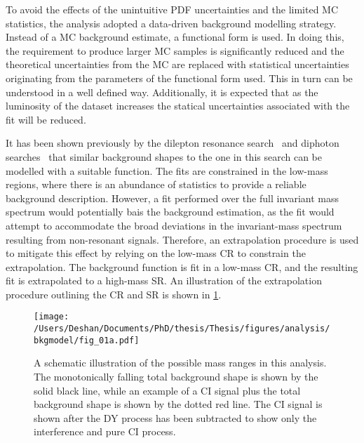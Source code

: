 To avoid the effects of the unintuitive PDF uncertainties and the limited MC statistics, the analysis adopted a data-driven background modelling strategy. Instead of a MC background estimate, a functional form is used. In doing this, the requirement to produce larger MC samples is significantly reduced and the theoretical uncertainties from the MC are replaced with statistical uncertainties originating from the parameters of the functional form used. This in turn can be understood in a well defined way. Additionally, it is expected that as the luminosity of the dataset increases the statical uncertainties associated with the fit will be reduced. 

It has been shown previously by the dilepton resonance search~\cite{Aad:2019fac} and diphoton searches~\cite{Aaboud:2016tru,Aaboud:2017yyg} that similar background shapes to the one in this search can be modelled with a suitable function. The fits are constrained in the low-mass regions, where there is an abundance of statistics to provide a reliable background description. However, a fit performed over the full invariant mass spectrum would potentially bais the background estimation, as the fit would attempt to accommodate the broad deviations in the invariant-mass spectrum resulting from non-resonant signals. Therefore, an extrapolation procedure is used to mitigate this effect by relying on the low-mass CR to constrain the extrapolation. The background function is fit in a low-mass CR, and the resulting fit is extrapolated to a high-mass SR. An illustration of the extrapolation procedure outlining the CR and SR is shown in \cref{fig:bkgmodel:ranges}.

\begin{figure}[!htpb]
    \centering
    \texttt{[image: /Users/Deshan/Documents/PhD/thesis/Thesis/figures/analysis/bkgmodel/fig\_01a.pdf]} 
    \caption[A schematic illustration of the possible mass ranges in this analysis.]{A schematic illustration of the possible mass ranges in this analysis.
    The monotonically falling total background shape is shown by the solid black line, while an example of a CI signal plus the total background shape is shown by the dotted red line. The CI signal is shown after the DY process has been subtracted to show only the interference and pure CI process.}
    \label{fig:bkgmodel:ranges}
\end{figure}

